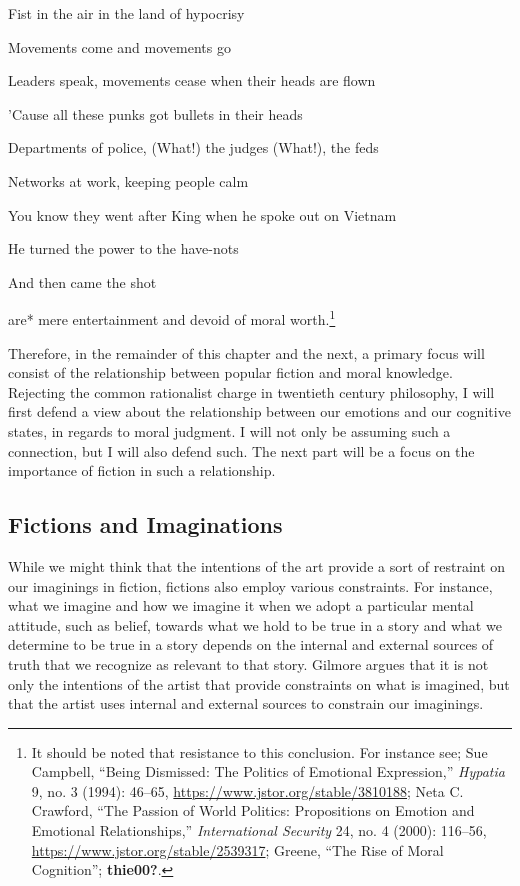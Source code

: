 \documentclass[
  12pt,
]{book}
\theoremstyle{definition}
\theoremstyle{definition}
\theoremstyle{definition}
\theoremstyle{definition}
\theoremstyle{remark}
\begin{document}
Fist in the air in the land of hypocrisy

Movements come and movements go

Leaders speak, movements cease when their heads are flown

'Cause all these punks got bullets in their heads

Departments of police, (What!) the judges (What!), the feds

Networks at work, keeping people calm

You know they went after King when he spoke out on Vietnam

He turned the power to the have-nots

And then came the shot

\noindent *are* mere entertainment and devoid of moral worth.\footnote{It should be noted that resistance to this conclusion. For instance see; Sue Campbell, {``Being {Dismissed}: {The Politics} of {Emotional Expression},''} \emph{Hypatia} 9, no. 3 (1994): 46--65, \url{https://www.jstor.org/stable/3810188}; Neta C. Crawford, {``The Passion of World Politics: Propositions on Emotion and Emotional Relationships,''} \emph{International Security} 24, no. 4 (2000): 116--56, \url{https://www.jstor.org/stable/2539317}; Greene, {``The Rise of Moral Cognition''}; \textbf{thie00?}.}

Therefore, in the remainder of this chapter and the next, a primary focus will consist of the relationship between popular fiction and moral knowledge. Rejecting the common rationalist charge in twentieth century philosophy, I will first defend a view about the relationship between our emotions and our cognitive states, in regards to moral judgment. I will not only be assuming such a connection, but I will also defend such. The next part will be a focus on the importance of fiction in such a relationship.

\subsection*{Fictions and Imaginations}\label{fictions-and-imaginations}

While we might think that the intentions of the art provide a sort of restraint on our imaginings in fiction, fictions also employ various constraints. For instance, what we imagine and how we imagine it when we adopt a particular mental attitude, such as belief, towards what we hold to be true in a story and what we determine to be true in a story depends on the internal and external sources of truth that we recognize as relevant to that story. Gilmore argues that it is not only the intentions of the artist that provide constraints on what is imagined, but that the artist uses internal and external sources to constrain our imaginings.
\end{document}
